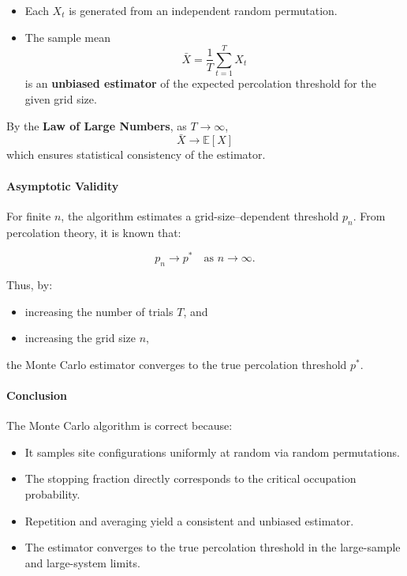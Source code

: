 \documentclass[11pt]{article}
\providecommand{\tightlist}{%
      \setlength{\itemsep}{0pt}\setlength{\parskip}{0pt}}
\begin{document}
\begin{itemize}
\tightlist
\item
  Each \(X_t\) is generated from an independent random permutation.
\item
  The sample mean \[\bar{X} = \frac{1}{T} \sum_{t=1}^T X_t\] is an
  \textbf{unbiased estimator} of the expected percolation threshold for
  the given grid size.
\end{itemize}

By the \textbf{Law of Large Numbers}, as \(T\to\infty\),
\[\bar{X} \xrightarrow{} \mathbb{E}[X]\] which ensures statistical
consistency of the estimator.

\paragraph{Asymptotic Validity}\label{asymptotic-validity}

For finite \(n\), the algorithm estimates a grid-size--dependent
threshold \(p_n\). From percolation theory, it is known that:

\[p_n \to p^* \quad \text{as } n \to \infty.\]

Thus, by:

\begin{itemize}
\tightlist
\item
  increasing the number of trials \(T\), and
\item
  increasing the grid size \(n\),
\end{itemize}

the Monte Carlo estimator converges to the true percolation threshold
\(p^*\).

\paragraph{Conclusion}\label{conclusion}

The Monte Carlo algorithm is correct because:

\begin{itemize}
\tightlist
\item
  It samples site configurations uniformly at random via random
  permutations.
\item
  The stopping fraction directly corresponds to the critical occupation
  probability.
\item
  Repetition and averaging yield a consistent and unbiased estimator.
\item
  The estimator converges to the true percolation threshold in the
  large-sample and large-system limits.
\end{itemize}
\end{document}
